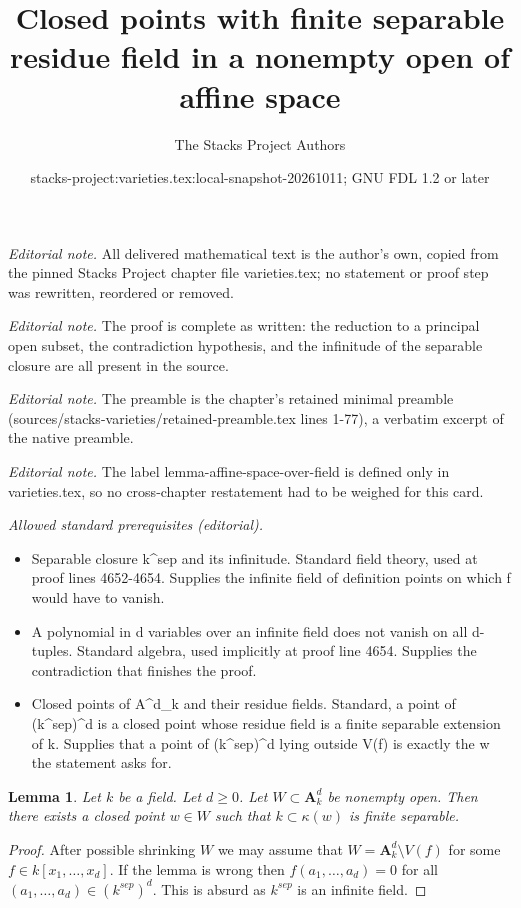 \documentclass[10pt,a4paper]{amsart}
\title{Closed points with finite separable residue field in a nonempty open of affine space}
\author{The Stacks Project Authors}
\date{stacks-project:varieties.tex:local-snapshot-20261011; GNU FDL 1.2 or later}
\theoremstyle{plain}
\newtheorem{lemma}[subsection]{Lemma}
\theoremstyle{definition}
\theoremstyle{remark}
\numberwithin{equation}{subsection}
\begin{document}
\maketitle
\noindent\textit{Editorial note.} All delivered mathematical text is the author's own, copied from the pinned Stacks Project chapter file varieties.tex; no statement or proof step was rewritten, reordered or removed.\par\medskip
\noindent\textit{Editorial note.} The proof is complete as written: the reduction to a principal open subset, the contradiction hypothesis, and the infinitude of the separable closure are all present in the source.\par\medskip
\noindent\textit{Editorial note.} The preamble is the chapter's retained minimal preamble (sources/stacks-varieties/retained-preamble.tex lines 1-77), a verbatim excerpt of the native preamble.\par\medskip
\noindent\textit{Editorial note.} The label lemma-affine-space-over-field is defined only in varieties.tex, so no cross-chapter restatement had to be weighed for this card.\par\medskip
\noindent\textit{Allowed standard prerequisites (editorial).}\begin{itemize}
\item Separable closure k\textasciicircum{}sep and its infinitude. Standard field theory, used at proof lines 4652-4654. Supplies the infinite field of definition points on which f would have to vanish.
\item A polynomial in d variables over an infinite field does not vanish on all d-tuples. Standard algebra, used implicitly at proof line 4654. Supplies the contradiction that finishes the proof.
\item Closed points of A\textasciicircum{}d\_k and their residue fields. Standard, a point of (k\textasciicircum{}sep)\textasciicircum{}d is a closed point whose residue field is a finite separable extension of k. Supplies that a point of (k\textasciicircum{}sep)\textasciicircum{}d lying outside V(f) is exactly the w the statement asks for.
\end{itemize}\medskip
\begin{lemma}
\label{lemma-affine-space-over-field}
Let $k$ be a field. Let $d \geq 0$. Let $W \subset \mathbf{A}^d_k$
be nonempty open. Then there exists a closed point $w \in W$ such that
$k \subset \kappa(w)$ is finite separable.
\end{lemma}

\begin{proof}
After possible shrinking $W$ we may assume that
$W = \mathbf{A}^d_k \setminus V(f)$ for some $f \in k[x_1, \ldots, x_d]$.
If the lemma is wrong then $f(a_1, \ldots, a_d) = 0$ for all
$(a_1, \ldots, a_d) \in (k^{sep})^d$. This is absurd as $k^{sep}$
is an infinite field.
\end{proof}
\end{document}
